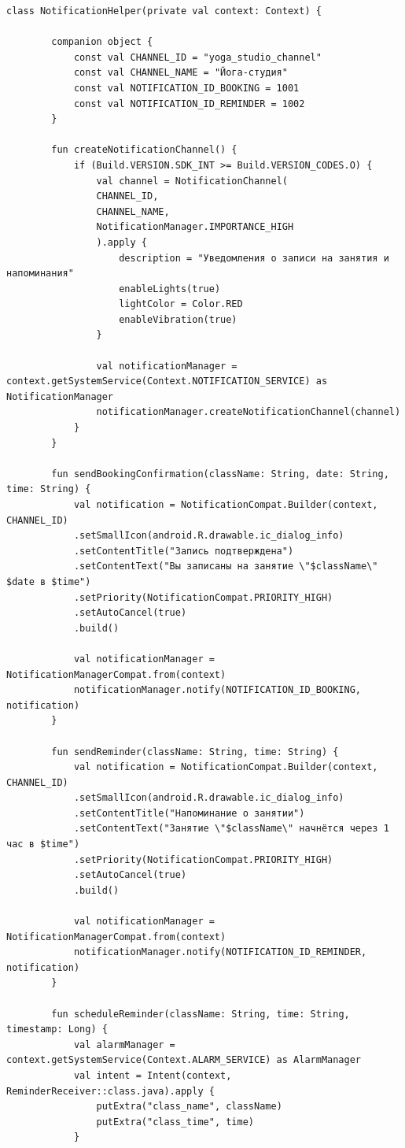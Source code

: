 \begin{lstlisting}[breaklines=true]
	class NotificationHelper(private val context: Context) {
		
		companion object {
			const val CHANNEL_ID = "yoga_studio_channel"
			const val CHANNEL_NAME = "Йога-студия"
			const val NOTIFICATION_ID_BOOKING = 1001
			const val NOTIFICATION_ID_REMINDER = 1002
		}
		
		fun createNotificationChannel() {
			if (Build.VERSION.SDK_INT >= Build.VERSION_CODES.O) {
				val channel = NotificationChannel(
				CHANNEL_ID,
				CHANNEL_NAME,
				NotificationManager.IMPORTANCE_HIGH
				).apply {
					description = "Уведомления о записи на занятия и напоминания"
					enableLights(true)
					lightColor = Color.RED
					enableVibration(true)
				}
				
				val notificationManager = context.getSystemService(Context.NOTIFICATION_SERVICE) as NotificationManager
				notificationManager.createNotificationChannel(channel)
			}
		}
		
		fun sendBookingConfirmation(className: String, date: String, time: String) {
			val notification = NotificationCompat.Builder(context, CHANNEL_ID)
			.setSmallIcon(android.R.drawable.ic_dialog_info)
			.setContentTitle("Запись подтверждена")
			.setContentText("Вы записаны на занятие \"$className\" $date в $time")
			.setPriority(NotificationCompat.PRIORITY_HIGH)
			.setAutoCancel(true)
			.build()
			
			val notificationManager = NotificationManagerCompat.from(context)
			notificationManager.notify(NOTIFICATION_ID_BOOKING, notification)
		}
		
		fun sendReminder(className: String, time: String) {
			val notification = NotificationCompat.Builder(context, CHANNEL_ID)
			.setSmallIcon(android.R.drawable.ic_dialog_info)
			.setContentTitle("Напоминание о занятии")
			.setContentText("Занятие \"$className\" начнётся через 1 час в $time")
			.setPriority(NotificationCompat.PRIORITY_HIGH)
			.setAutoCancel(true)
			.build()
			
			val notificationManager = NotificationManagerCompat.from(context)
			notificationManager.notify(NOTIFICATION_ID_REMINDER, notification)
		}
		
		fun scheduleReminder(className: String, time: String, timestamp: Long) {
			val alarmManager = context.getSystemService(Context.ALARM_SERVICE) as AlarmManager
			val intent = Intent(context, ReminderReceiver::class.java).apply {
				putExtra("class_name", className)
				putExtra("class_time", time)
			}
			

\end{lstlisting}
